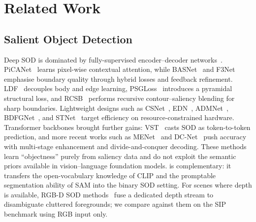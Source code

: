 \section{Related Work}
\label{sec:related}

\subsection{Salient Object Detection}
Deep SOD is dominated by fully-supervised encoder--decoder
networks~\cite{borji2015salient,wang2021salientsurvey}.
PiCANet~\cite{picanet2018} learns pixel-wise contextual attention, while
BASNet~\cite{basnet2019} and F3Net~\cite{f3net2020} emphasise boundary quality
through hybrid losses and feedback refinement. LDF~\cite{ldf2020} decouples body
and edge learning, PSGLoss~\cite{psgloss2021} introduces a pyramidal structural
loss, and RCSB~\cite{rcsb2022} performs recursive contour--saliency blending for
sharp boundaries. Lightweight designs such as CSNet~\cite{csnet2020},
EDN~\cite{edn2022}, ADMNet~\cite{sod_admnet}, BDFGNet~\cite{sod_bdfgnet}, and
STNet~\cite{sod_stnet} target efficiency on resource-constrained hardware.
Transformer backbones brought further gains: VST~\cite{vst2021} casts SOD as
token-to-token prediction, and more recent works such as MENet~\cite{menet2023}
and DC-Net~\cite{sod_dcnet} push accuracy with multi-stage enhancement and
divide-and-conquer decoding.  These
methods learn ``objectness'' purely from
saliency data and do not exploit the semantic priors available in vision--language
foundation models. \methodname{} is complementary: it transfers the open-vocabulary
knowledge of CLIP and the promptable segmentation ability of SAM into the binary
SOD setting. For scenes where depth is available, RGB-D SOD
methods~\cite{sod_s2ma,sod_bbsnet,sod_jldcf,sod_spnet,sod_spsn} fuse a dedicated
depth stream to disambiguate cluttered foregrounds; we compare against them on the
SIP benchmark using RGB input only.

